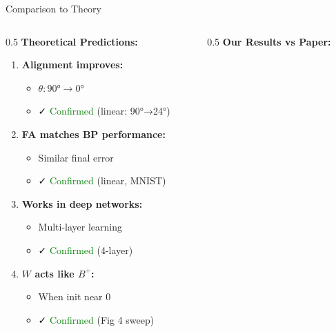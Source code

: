 \documentclass[aspectratio=169,10pt]{beamer}
\begin{document}
\begin{frame}{Comparison to Theory}
  \begin{columns}[T]
    \begin{column}{0.5\textwidth}
      \textbf{Theoretical Predictions:}

      \vspace{0.3cm}
      \begin{enumerate}
        \item \textbf{Alignment improves:}
        \begin{itemize}
          \item $\theta: 90° \rightarrow 0°$
          \item ✓ \textcolor{green}{Confirmed} (linear: 90°→24°)
        \end{itemize}

        \vspace{0.2cm}
        \item \textbf{FA matches BP performance:}
        \begin{itemize}
          \item Similar final error
          \item ✓ \textcolor{green}{Confirmed} (linear, MNIST)
        \end{itemize}

        \vspace{0.2cm}
        \item \textbf{Works in deep networks:}
        \begin{itemize}
          \item Multi-layer learning
          \item ✓ \textcolor{green}{Confirmed} (4-layer)
        \end{itemize}

        \vspace{0.2cm}
        \item \textbf{$W$ acts like $B^+$:}
        \begin{itemize}
          \item When init near 0
          \item ✓ \textcolor{green}{Confirmed} (Fig 4 sweep)
        \end{itemize}
      \end{enumerate}
    \end{column}

    \begin{column}{0.5\textwidth}
      \textbf{Our Results vs Paper:}


\end{column}
\end{columns}
\end{frame}
\end{document}
